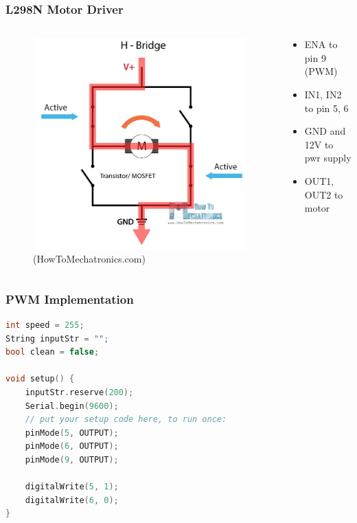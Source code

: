 \documentclass[compress, aspectratio=32]{beamer}
\begin{document}
\begin{frame}
    \frametitle{L298N Motor Driver}
    \begin{columns}
        \begin{column}{0.5\textwidth}
            \begin{figure}
                \centering
                \includegraphics[height=0.7\textheight]{H-Bridge-configuration-How-It-Works.png.jpg}
                \caption*{(HowToMechatronics.com)}
            \end{figure}
        \end{column}
        \begin{column}{0.5\textwidth}
            \begin{itemize}
                \item ENA to pin 9 (PWM)
                \item IN1, IN2 to pin 5, 6
                \item GND and 12V to pwr supply
                \item OUT1, OUT2 to motor
            \end{itemize}
        \end{column}
    \end{columns}
\end{frame}

\begin{frame}[fragile]
    \frametitle{PWM Implementation}
    \begin{lstlisting}[language=c]
int speed = 255;
String inputStr = "";
bool clean = false;

void setup() {
    inputStr.reserve(200);
    Serial.begin(9600);
    // put your setup code here, to run once:
    pinMode(5, OUTPUT);
    pinMode(6, OUTPUT);
    pinMode(9, OUTPUT);

    digitalWrite(5, 1);
    digitalWrite(6, 0);
}

    \end{lstlisting}
\end{frame}
\end{document}
